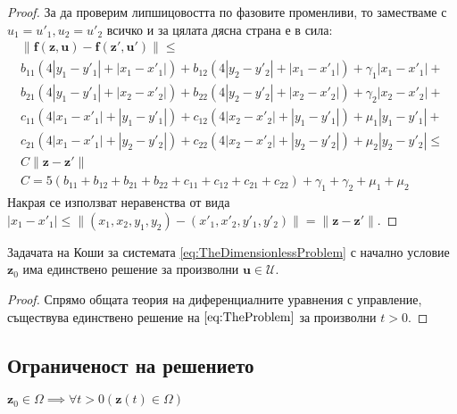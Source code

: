 \begin{proof}
  За да проверим липшицовостта по фазовите променливи, то заместваме с $u_1 = u'_1, u_2 = u'_2$ всичко и за цялата дясна страна е в сила:
  \begin{multline}
  \label{eq:LipschitzContinuity}
    \|\mathbf{f}(\mathbf{z}, \mathbf{u}) - \mathbf{f}(\mathbf{z}', \mathbf{u}')\| \leq \\
    b_{11} (4 |y_1 - y'_1| + |x_1 - x'_1|) +
    b_{12} (4 |y_2 - y'_2| + |x_1 - x'_1|) + \gamma_1 |x_1-x'_1| + \\
    b_{21} (4 |y_1 - y'_1| + |x_2 - x'_2|) +
    b_{22} (4 |y_2 - y'_2| + |x_2 - x'_2|) + \gamma_2 |x_2-x'_2| + \\
    c_{11} (4 |x_1 - x'_1| + |y_1 - y'_1|) +
    c_{12} (4 |x_2 - x'_2| + |y_1 - y'_1|) + \mu_1 |y_1 - y'_1| + \\
    c_{21} (4 |x_1 - x'_1| + |y_2 - y'_2|) +
    c_{22} (4 |x_2 - x'_2| + |y_2 - y'_2|) + \mu_2 |y_2 - y'_2| \leq \\
    C \|\mathbf{z} - \mathbf{z}'\| \\
    C = 5 (b_{11} + b_{12} + b_{21} + b_{22} + c_{11} + c_{12} + c_{21} + c_{22}) + \gamma_1 + \gamma_2 + \mu_1 + \mu_2
  \end{multline}
  Накрая се използват неравенства от вида $|x_1-x'_1| \leq \|(x_1, x_2, y_1, y_2) - (x'_1, x'_2, y'_1, y'_2)\| = \|\mathbf{z} - \mathbf{z}'\|$.
\end{proof}

\begin{corollary}
\label{cor:ExistanceAndUniqueness}
Задачата на Коши за системата \eqref{eq:TheDimensionlessProblem} с начално условие $\mathbf{z}_0$ има единствено решение за произволни $\mathbf{u} \in \mathscr{U}$.
\end{corollary}

\begin{proof}
Спрямо общата теория на диференциалните уравнения с управление, съществува единствено решение на $\eqref{eq:TheProblem}$ за произволни $t>0$.
\end{proof}

\subsection{Ограниченост на решението}

\begin{proposition}
  $\mathbf{z}_0 \in \Omega \implies \forall{t>0}\left(\mathbf{z}(t) \in \Omega\right)$
\end{proposition}

